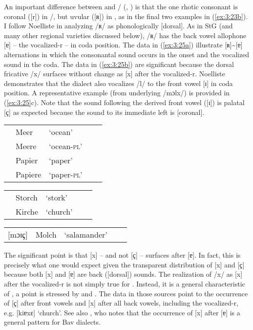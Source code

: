 \begin{sloppypar}
An important difference between  and \slash{} (, ) is that the one rhotic consonant is coronal ([r]) in \slash{}, but uvular ([ʀ]) in , as in the final two examples in (\ref{ex:3:23b}). I follow Noelliste in analyzing /ʀ/ as phonologically [dorsal]. As in StG (and many other regional varieties discussed below), /ʀ/ has the back vowel allophone [ɐ] -- the vocalized-r -- in coda position. The data in (\ref{ex:3:25a}) illustrate [ʀ]{\textasciitilde}[ɐ] alternations in which the consonantal sound occurs in the onset and the vocalized sound in the coda. The data in (\ref{ex:3:25b}) are significant because the dorsal fricative /x/ surfaces without change as [x] after the vocalized-r. Noelliste demonstrates that the dialect also vocalizes /l/ to the front vowel [ɪ] in coda position. A representative example (from underlying /mɔlx/) is provided in (\ref{ex:3:25}c). Note that the sound following the derived front vowel ([ɪ]) is palatal [ҫ] as expected because the sound to its immediate left is [coronal].
\end{sloppypar}

\ea%
    \label{ex:3:25}
\ea \label{ex:3:25a}\begin{tabular}[t]{@{}p{2cm}p{2cm}p{2cm}p{2cm}>{\raggedleft\arraybackslash}p{8mm}@{}}
  \relax [meɐ]      & Meer    & ‘ocean’ \\
  \relax [me.ʀə]    & Meere   & ‘ocean-\textsc{pl}’\\
  \relax [pə.piɐ]   & Papier  & ‘paper’ \\
  \relax [pə.pi.ʀə] & Papiere & ‘paper-\textsc{pl}’\\
  \end{tabular}
\ex \label{ex:3:25b}\begin{tabular}[t]{@{}p{2cm}p{2cm}p{2cm}p{2cm}>{\raggedleft\arraybackslash}p{8mm}@{}}
 \relax [ʃtɔɐx] & Storch & ‘stork’  \\
 \relax [kiɐxŋ̩]&  Kirche&  ‘church’\\
  \end{tabular}
\ex  \begin{tabular}[t]{@{}p{2cm}p{2cm}p{2cm}p{2cm}>{\raggedleft\arraybackslash}p{8mm}@{}}
  [mɔɪҫ] & Molch & ‘salamander’
  \end{tabular}
\z 
\z 

The significant point is that [x] -- and not [{ҫ}] -- surfaces after [ɐ]. In fact, this is precisely what one would expect given the transparent distribution of [x] and [{ҫ}] because both [x] and [ɐ] are back ([dorsal]) sounds. The realization of /x/ as [x] after the vocalized-r is not simply true for . Instead, it is a general characteristic of , a point is stressed by \citet{hildenbrandt2013} and \citet{MoosmüllerBrandstätter2015}. The data in those sources point to the occurrence of [ҫ] after front vowels and [x] after all back vowels, including the vocalized-r, e.g. [kiɐxɛ] ‘church’.  See also \citet[12]{Capell1979}, who notes that the occurrence of [x] after [ɐ] is a general pattern for Bav dialects. 

